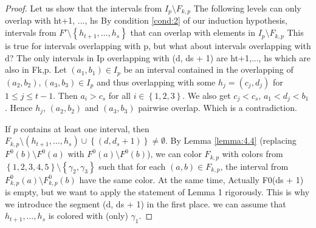 \documentclass[12pt]{article}
\theoremstyle{definition}
\begin{document}
\begin{proof}
        Let us show that the 
        intervals from $I_{p}
        \setminus F_{k, p}$ 
        {The following
        levels can only 
        overlap with 
        {ht+1,
        ..., hs}}
        By condition \ref{cond:2}
        of our induction hypothesis, 
        intervals from
        $F' \setminus \left\{h_{t+1},
        \ldots, h_{s}\right\}$
        that can overlap with 
        elements in $I_{p} \setminus 
        F_{k,p}$ 
        {This is true for intervals
        overlapping with p, but what
        about intervals overlapping
        with d?
        The only intervals in
        Ip overlapping
        with (d, ds + 1) 
        are ht+1,...,
        hs which are
        also in Fk,p.}
        Let $\left(a_1, b_1\right) \in I_{p}$ 
        be an interval contained in the
        overlapping of
        $\left(a_2, b_2\right), 
        \left(a_3, b_3\right)
        \in I_{p}$ and thus
        overlapping with some
        $h_{j} =\left(c_{j}, d_{j}\right)$ 
        for $1 \leq j \leq t-1$.
        Then $a_{i} > c_{s}$ for
        all $i \in \left\{1, 2, 3\right\}$.
        We also get $c_{j} < c_{s}$,
        $a_1 < d_{j} < b_1$. Hence
        $h_{j}$, $\left(a_2, b_2\right)$ 
        and $\left(a_3, b_3\right)$ 
        pairwise overlap.
        Which is a contradiction.

        If $p$ contains at least one interval,
        then $F_{k, p} \setminus \left(h_{t+1},
        \ldots, h_{s}\right) \cup 
        \left\{\left(d, d_{s} + 1\right)\right\}
        \neq \emptyset$.
        By Lemma \ref{lemma:4.4}
        (replacing $F^{0}\left(b\right)
        \setminus F^{0}\left(a\right)$
        with $F^{0}\left(a\right)
        \setminus F^{0}\left(b\right)$),
        we can color $F_{k, p}$ 
        with colors from
        $\left\{1,2,3,4,5\right\} \setminus 
        \left\{\gamma_2, \gamma_3\right\}$
        such that
        for each
        $\left(a, b\right) \in 
        F_{k, p}$,
        the interval from
        $F^{0}_{k, p}\left(a\right) \setminus 
        F^{0}_{k, p}\left(b\right)$
        have the same color.
        At the same time,
        {Actually 
        F0(ds + 1) 
        is empty, but we want
        to apply the statement
        of Lemma 1
        rigorously. This
        is why we introduce
        the segment (d, ds + 1) 
        in the first place.}
        we can assume that 
        $h_{t+1}, \ldots,
        h_{s}$ is colored 
        with (only) $\gamma_1$.
        

\end{proof}
\end{document}
